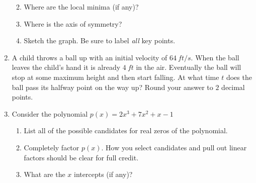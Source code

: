 \documentclass[letterpaper,12pt,fleqn]{article}
\begin{document}
\begin{enumerate}
\begin{enumerate}
    \vspace{0.5in}
    
  \item Where are the local minima (if any)?

    \vspace{0.5in}
    
  \item Where is the axis of symmetry?

    \vspace{0.5in}
    
  \item Sketch the graph. Be sure to label \emph{all} key points.

    \bigskip

    \begin{figure}[h]
      \setlength{\leftskip}{1in}
    \end{figure}
  \end{enumerate}

  \newpage

\item A child throws a ball up with an initial velocity of $\SI{64}{ft/s}$.
  When the ball leaves the child's hand it is already $\SI{4}{ft}$ in the air.
  Eventually the ball will stop at some maximum height and then start falling.
  At what time $t$ does the ball pass its halfway point on the way up? Round
  your answer to $2$ decimal points.

  \newpage

\item Consider the polynomial $p(x)=2x^3+7x^2+x-1$
  \begin{enumerate}
  \item List all of the possible candidates for real zeros of the polynomial.

    \vspace{2in}
    
  \item Completely factor $p(x)$. How you select candidates and pull out
    linear factors should be clear for full credit.

    \newpage

  \item What are the $x$ intercepts (if any)?

    \vspace{1in}
    

\end{enumerate}
\end{enumerate}
\end{document}
